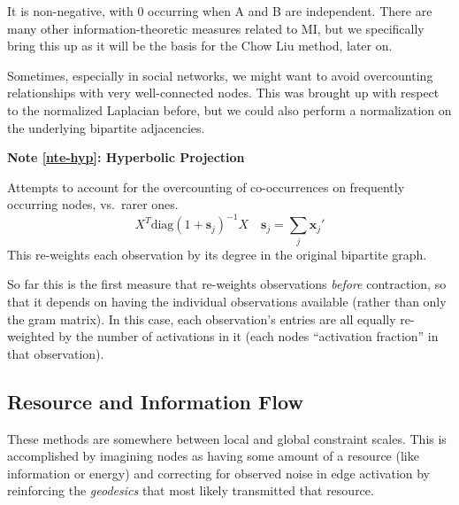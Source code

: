 \documentclass[%
	12pt,
		oneside,
		letterpaper
]{book}
\newcounter{quartocalloutnteno}
\newcommand{\quartocalloutnte}[1]{\refstepcounter{quartocalloutnteno}\label{#1}}
\begin{document}
It is non-negative, with 0 occurring when A and B are independent. There
are many other information-theoretic measures related to MI, but we
specifically bring this up as it will be the basis for the Chow Liu
method, later on.

Sometimes, especially in social networks, we might want to avoid
overcounting relationships with very well-connected nodes. This was
brought up with respect to the normalized Laplacian before, but we could
also perform a normalization on the underlying bipartite adjacencies.

\begin{tcolorbox}[enhanced jigsaw, colback=white, arc=.35mm, toprule=.15mm, opacityback=0, colframe=quarto-callout-note-color-frame, bottomrule=.15mm, rightrule=.15mm, leftrule=.75mm, left=2mm, breakable]

\quartocalloutnte{nte-hyp} 

\vspace{-3mm}\textbf{Note \ref*{nte-hyp}: Hyperbolic Projection}\vspace{3mm}

Attempts to account for the overcounting of co-occurrences on frequently
occurring nodes, vs.~rarer
ones.\autocite{Scientificcollaborationnetworks._Newman2001}
\[ X^T\text{diag}(1+\mathbf{s}_j)^{-1}X \quad \mathbf{s}_j = \sum_j{\mathbf{x}_j'}\]
This re-weights each observation by its degree in the original bipartite
graph.

\end{tcolorbox}

So far this is the first measure that re-weights observations
\emph{before} contraction, so that it depends on having the individual
observations available (rather than only the gram matrix). In this case,
each observation's entries are all equally re-weighted by the number of
activations in it (each nodes ``activation fraction'' in that
observation).

\subsection{Resource and Information
Flow}\label{resource-and-information-flow}

These methods are somewhere between local and global constraint scales.
This is accomplished by imagining nodes as having some amount of a
resource (like information or energy) and correcting for observed noise
in edge activation by reinforcing the \emph{geodesics} that most likely
transmitted that resource.
\end{document}

